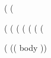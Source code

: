 (%
(%
\usepackage{graphicx}

\usepackage[labelformat=empty]{caption}

\renewcommand{\deg}{^\circ}
(%
(%
\newenvironment{marginfigure}[1][]{%
\begin{figure}}
{\end{figure}}
(%
(%
(%
(%
(%

(%
(( body ))
